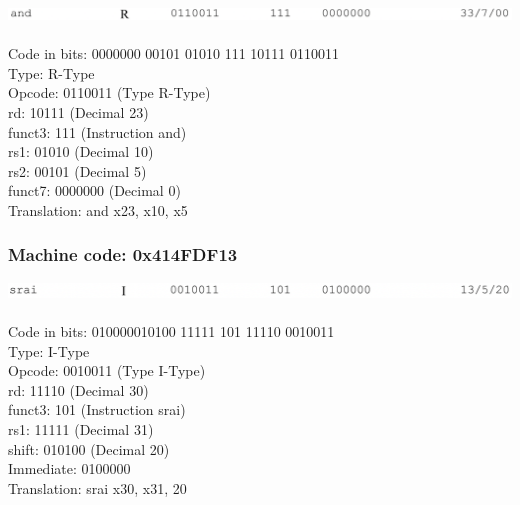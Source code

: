 \documentclass{article}
\begin{document}
\includegraphics[scale=.3]{images/andq4.png}
\\\\
Code in bits: 0000000 00101 01010 111 10111 0110011\\
Type: R-Type\\
Opcode: 0110011 (Type R-Type)\\
rd: 10111 (Decimal 23)\\
funct3: 111 (Instruction and)\\
rs1: 01010 (Decimal 10)\\
rs2: 00101 (Decimal 5)\\
funct7: 0000000 (Decimal 0)\\
Translation: and x23, x10, x5\\

\subsubsection*{Machine code: 0x414FDF13}

\includegraphics[scale=.3]{images/sraiq4.png}
\\\\
Code in bits: 010000010100 11111 101 11110 0010011\\
Type: I-Type\\
Opcode: 0010011 (Type I-Type)\\
rd: 11110 (Decimal 30)\\
funct3: 101 (Instruction srai)\\
rs1: 11111 (Decimal 31)\\
shift: 010100 (Decimal 20)\\
Immediate: 0100000\\
Translation: srai x30, x31, 20\\
\end{document}
